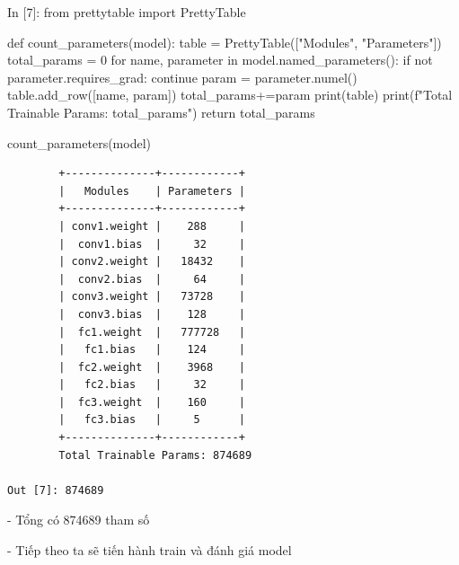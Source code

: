 \documentclass[12pt, a4paper]{article}
\begin{document}
\begin{python}
In [7]: from prettytable import PrettyTable
        
        def count_parameters(model):
            table = PrettyTable(["Modules", "Parameters"])
            total_params = 0
            for name, parameter in model.named_parameters():
                if not parameter.requires_grad: 
                    continue
                param = parameter.numel()
                table.add_row([name, param])
                total_params+=param
            print(table)
            print(f"Total Trainable Params: {total_params}")
            return total_params
        
        count_parameters(model)
\end{python}
\begin{verbatim}
        +--------------+------------+
        |   Modules    | Parameters |
        +--------------+------------+
        | conv1.weight |    288     |
        |  conv1.bias  |     32     |
        | conv2.weight |   18432    |
        |  conv2.bias  |     64     |
        | conv3.weight |   73728    |
        |  conv3.bias  |    128     |
        |  fc1.weight  |   777728   |
        |   fc1.bias   |    124     |
        |  fc2.weight  |    3968    |
        |   fc2.bias   |     32     |
        |  fc3.weight  |    160     |
        |   fc3.bias   |     5      |
        +--------------+------------+
        Total Trainable Params: 874689

Out [7]: 874689

\end{verbatim}
\par - Tổng có 874689 tham số
\vspace{0.5cm}
\newpage
\par - Tiếp theo ta sẽ tiến hành train và đánh giá model
\end{document}
